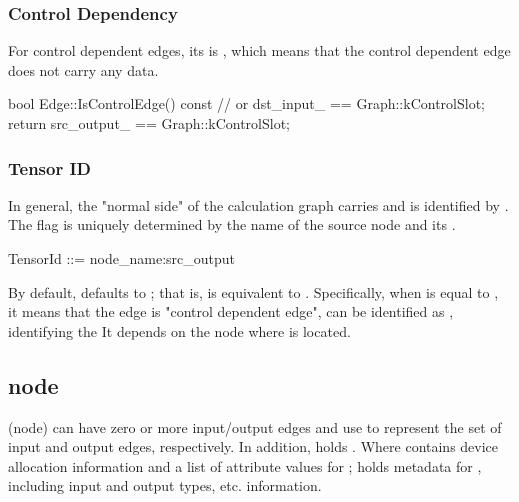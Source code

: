 \begin{content}
\subsubsection{Control Dependency}

For control dependent edges, its  is , which means that the control dependent edge does not carry any data.

\begin{leftbar}
\begin{c++}
bool Edge::IsControlEdge() const {
   // or dst\_input\_ == Graph::kControlSlot;
   return src_output_ == Graph::kControlSlot;
}
\end{c++}
\end{leftbar}

\subsubsection{Tensor ID}

In general, the "normal side" of the calculation graph carries  and is identified by . The  flag is uniquely determined by the name of the source node and its .

\begin{leftbar}
\begin{c++}
TensorId ::= node_name:src_output
\end{c++}
\end{leftbar}

By default,  defaults to ; that is,  is equivalent to . Specifically, when  is equal to , it means that the edge is "control dependent edge",  can be identified as , identifying the It depends on the node where  is located.

\subsection{node}

 (node) can have zero or more input/output edges and use  to represent the set of input and output edges, respectively. In addition,  holds . Where  contains device allocation information and a list of attribute values ​​for ;  holds metadata for , including  input and output types, etc. information.


\end{content}
